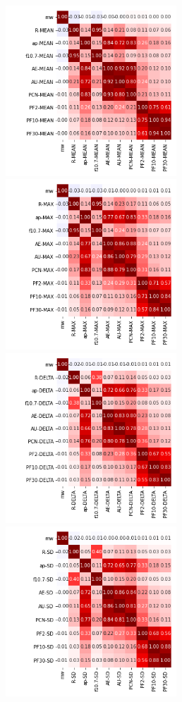 \documentclass[12pt]{article}
\begin{document}
\newpage

\begin{figure}
   \includegraphics[width=0.57\textwidth]{five-six_mean_3.png}
   \includegraphics[width=0.57\textwidth]{five-six_max_3.png}
   \includegraphics[width=0.57\textwidth]{five-six_delta_3.png}
   \includegraphics[width=0.57\textwidth]{five-six_sd_3.png}
\end{figure}
\end{document}
